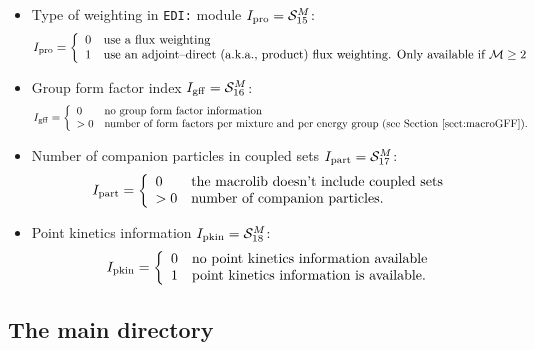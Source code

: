 \begin{itemize}
\begin{displaymath}
\begin{array}{ll}
\end{array} \right.
\end{displaymath}
\item Type of weighting in {\tt EDI:} module $I_{\rm pro}=\mathcal{S}^{M}_{15}$:
\begin{displaymath}
I_{\rm pro} = \left\{
\begin{array}{ll}
0 & \textrm{use a flux weighting}\\
1 & \textrm{use an adjoint--direct (a.k.a., product) flux weighting. Only available if $\mathcal{M}\ge 2$}
\end{array} \right.
\end{displaymath}
\item Group form factor index $I_{\rm gff}=\mathcal{S}^{M}_{16}$:
\begin{displaymath}
I_{\rm gff} = \left\{
\begin{array}{ll}
0 & \textrm{no group form factor information}\\
>0 & \textrm{number of form factors per mixture and per energy group (see \Sect{macroGFF}).}
\end{array} \right.
\end{displaymath}
\item Number of companion particles in coupled sets $I_{\rm part}=\mathcal{S}^{M}_{17}$:
\begin{displaymath}
I_{\rm part} = \left\{
\begin{array}{ll}
0 & \textrm{the macrolib doesn't include coupled sets}\\
>0 & \textrm{number of companion particles.}
\end{array} \right.
\end{displaymath}
\item Point kinetics information $I_{\rm pkin}=\mathcal{S}^{M}_{18}$:
\begin{displaymath}
I_{\rm pkin} = \left\{
\begin{array}{ll}
0 & \textrm{no point kinetics information available}\\
1 & \textrm{point kinetics information is available.}
\end{array} \right.
\end{displaymath}
\end{itemize}

\subsection{The main  directory}\label{sect:macrolibdirmain}

